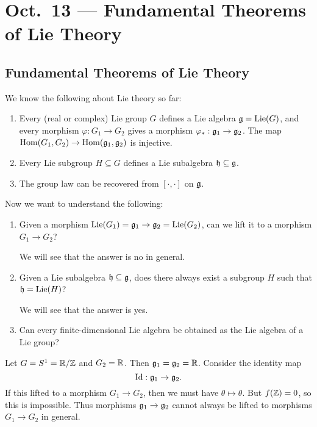 \chapter{Oct.~13 --- Fundamental Theorems of Lie Theory}

\section{Fundamental Theorems of Lie Theory}
\begin{remark}
  We know the following about
  Lie theory so far:
  \begin{enumerate}
    \item Every (real or complex) Lie
      group $G$ defines a Lie algebra
      $\mathfrak{g} = \operatorname{Lie}(G)$, and every morphism
      $\varphi : G_1 \to G_2$ gives a
      morphism $\varphi_* : \mathfrak{g}_1 \to \mathfrak{g}_2$.
      The map $\operatorname{Hom}(G_1, G_2) \to \operatorname{Hom}(\mathfrak{g}_1, \mathfrak{g}_2)$
      is injective.
    \item Every Lie subgroup $H \subseteq G$
      defines a Lie subalgebra
      $\mathfrak{h} \subseteq \mathfrak{g}$.
    \item The group law can be recovered
      from $[\cdot, \cdot]$ on $\mathfrak{g}$.
  \end{enumerate}
  Now we want to understand the following:
  \begin{enumerate}
    \item Given a morphism
      $\operatorname{Lie}(G_1) = \mathfrak{g}_1 \to \mathfrak{g}_2 = \operatorname{Lie}(G_2)$,
      can we lift it to a morphism
      $G_1 \to G_2$?

      We will see that the answer is
      no in general.
    \item Given a Lie subalgebra
      $\mathfrak{h} \subseteq \mathfrak{g}$,
      does there always exist a subgroup
      $H$ such that $\mathfrak{h} = \operatorname{Lie}(H)$?

      We will see that the answer is
      yes.
    \item Can every finite-dimensional
      Lie algebra be obtained as
      the Lie algebra of a Lie group?
  \end{enumerate}
\end{remark}

\begin{example}
  Let $G = S^1 = \mathbb{R} / \mathbb{Z}$ and
  $G_2 = \mathbb{R}$. Then $\mathfrak{g}_1 = \mathfrak{g}_2 = \mathbb{R}$.
  Consider the identity map
  \[\operatorname{Id} : \mathfrak{g}_1 \to \mathfrak{g}_2.\]
  If this lifted to a morphism $G_1 \to G_2$, then
  we must have $\theta \mapsto \theta$.
  But $f(\mathbb{Z}) = 0$, so this is impossible.
  Thus morphisms
  $\mathfrak{g}_1 \to \mathfrak{g}_2$ cannot always be lifted
  to morphisms $G_1 \to G_2$ in general.
\end{example}

